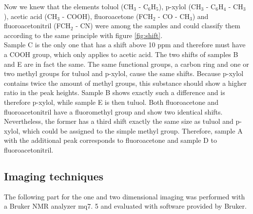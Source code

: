 Now we knew that the elements toluol (CH$_3$ - C$_6$H$_5$), p-xylol (CH$_3$ - C$_6$H$_4$ - CH$_3$), acetic acid (CH$_3$ - COOH), fluoroacetone (FCH$_2$ - CO - CH$_3$) and fluoroacetonitril (FCH$_2$ - CN) were among the samples and could classify them according to the same principle with figure \ref{fig:shift}.\\
Sample C is the only one that has a shift above 10 ppm and therefore must have a COOH group, which only applies to acetic acid.
The two shifts of samples B and E are in fact the same.
The same functional groups, a carbon ring and one or two methyl groups for tuluol and p-xylol, cause the same shifts.
Because p-xylol contains twice the amount of methyl groups, this substance should show a higher ratio in the peak heights.
Sample B shows exactly such a difference and is therefore p-xylol, while sample E is then tuluol.
Both fluoroacetone and fluoroacetonitril have a fluoromethyl group and show two identical shifts.
Nevertheless, the former has a third shift exactly the same size as tuluol and p-xylol, which could be assigned to the simple methyl group.
Therefore, sample A with the additional peak corresponds to fluoroacetone and sample D to fluoroacetonitril.


\subsection{Imaging techniques}
The following part for the one and two dimensional imaging was performed with a Bruker NMR analyzer mq7. 5 and evaluated with software provided by Bruker.
